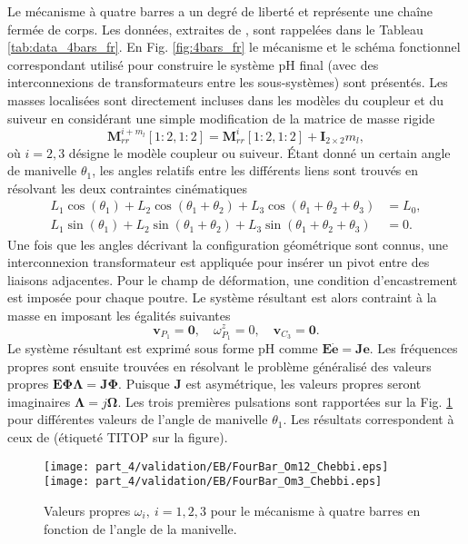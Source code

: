 Le mécanisme à quatre barres a un degré de liberté et représente une chaîne fermée de corps. Les données, extraites de \cite{kitis1990natural,chebbi2017}, sont rappelées dans le Tableau \ref{tab:data_4bars_fr}. En Fig. \ref{fig:4bars_fr} le mécanisme et le schéma fonctionnel correspondant utilisé pour construire le système pH final (avec des interconnexions de transformateurs entre les sous-systèmes) sont présentés. Les masses localisées sont directement incluses dans les modèles du coupleur et du suiveur en considérant une simple modification de la matrice de masse rigide
\begin{equation*}
\mathbf{M}_{rr}^{i + m_l}[1:2,1:2] = \mathbf{M}_{rr}^{i}[1:2,1:2] + \mathbf{I}_{2\times 2} m_l,
\end{equation*} 
où $i = 2,3$ désigne le modèle coupleur ou suiveur. Étant donné un certain angle de manivelle $\theta_1$, les angles relatifs entre les différents liens sont trouvés en résolvant les deux contraintes cinématiques
\begin{align*}
L_1 \cos(\theta_1)+ L_2 \cos(\theta_1+\theta_2)+ L_3 \cos(\theta_1+\theta_2+\theta_3) &=L_0, \\
L_1 \sin(\theta_1)+L_2 \sin(\theta_1+\theta_2)+L_3 \sin(\theta_1+\theta_2+\theta_3) &=0.
\end{align*} 
Une fois que les angles décrivant la configuration géométrique sont connus, une interconnexion transformateur est appliquée pour insérer un pivot entre des liaisons adjacentes. Pour le champ de déformation, une condition d'encastrement est imposée pour chaque poutre. Le système résultant est alors contraint à la masse en imposant les égalités suivantes
\begin{equation*}
\mathbf{v}_{P_1} = \mathbf{0}, \quad \omega^z_{P_1} = 0, \quad \mathbf{v}_{C_3} = \mathbf{0}.
\end{equation*}
Le système résultant est exprimé sous forme pH comme $\mathbf{E} \dot{\mathbf{e}} = \mathbf{J} \mathbf{e}$. Les fréquences propres sont ensuite trouvées en résolvant le problème généralisé des valeurs propres $\mathbf{E} \bm{\Phi \Lambda} = \mathbf{J} \bm{\Phi} $. Puisque $\mathbf{J} $ est asymétrique, les valeurs propres seront imaginaires $\bm{\Lambda} = j \bm{\Omega} $. Les trois premières pulsations sont rapportées sur la Fig. \ref{fig:omega_4bars_fr} pour différentes valeurs de l'angle de manivelle $\theta_1$. Les résultats correspondent à ceux de \cite{chebbi2017} (étiqueté TITOP sur la figure).

\begin{figure}[tb]
	\centering
	\texttt{[image: part\_4/validation/EB/FourBar\_Om12\_Chebbi.eps]} 
	\texttt{[image: part\_4/validation/EB/FourBar\_Om3\_Chebbi.eps]} 
	\caption{Valeurs propres $\omega_i, \ i = 1,2,3 $ pour le mécanisme à quatre barres en fonction de l'angle de la manivelle.}
	\label{fig:omega_4bars_fr}
\end{figure}


